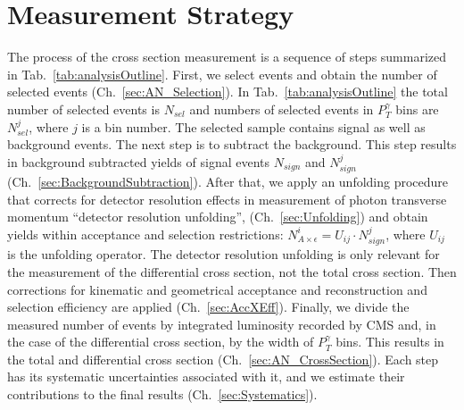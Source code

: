 \section{Measurement Strategy}
\label{sec:AN_WgMeasStrategy}

The process of the cross section measurement is a sequence of steps summarized in Tab.~\ref{tab:analysisOutline}. First, we select events and obtain the number of selected events (Ch.~\ref{sec:AN_Selection}). In Tab.~\ref{tab:analysisOutline} the total number of selected events is $N_{sel}$ and numbers of selected events in $P_T^{\gamma}$ bins are $N_{sel}^j$, where $j$ is a bin number. The selected sample contains signal as well as background events. The next step is to subtract the background. This step results in background subtracted yields of signal events $N_{sign}$ and $N_{sign}^j$ (Ch.~\ref{sec:BackgroundSubtraction}). After that, we apply an unfolding procedure that corrects for detector resolution effects in measurement of photon transverse momentum ``detector resolution unfolding'', (Ch.~\ref{sec:Unfolding}) and obtain yields within acceptance and selection restrictions: $N_{A\times\epsilon}^i = U_{ij} \cdot N_{sign}^j$, where $U_{ij}$ is the unfolding operator. The detector resolution unfolding is only relevant for the measurement of the differential cross section, not the total cross section. Then corrections for kinematic and geometrical acceptance and reconstruction and selection efficiency are applied (Ch.~\ref{sec:AccXEff}). Finally, we divide the measured number of events by integrated luminosity recorded by CMS and, in the case of the differential cross section, by the width of $P_T^{\gamma}$ bins. This results in the total and differential cross section (Ch.~\ref{sec:AN_CrossSection}). Each step has its systematic uncertainties associated with it, and we estimate their contributions to the final results (Ch.~\ref{sec:Systematics}).

